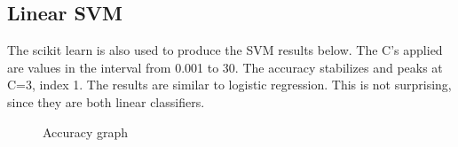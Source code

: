 \subsection{Linear SVM}
The scikit learn is also used to produce the SVM results below. The C's applied are values in the interval from 0.001 to 30. The accuracy stabilizes and peaks at C=3, index 1. The results are similar to logistic regression. This is not surprising, since they are both linear classifiers.  
\\
\par
\begin{figure}[H]
  \centering
  \hfill
  \hfill
   \caption{Accuracy graph}
\end{figure}
\newpage
